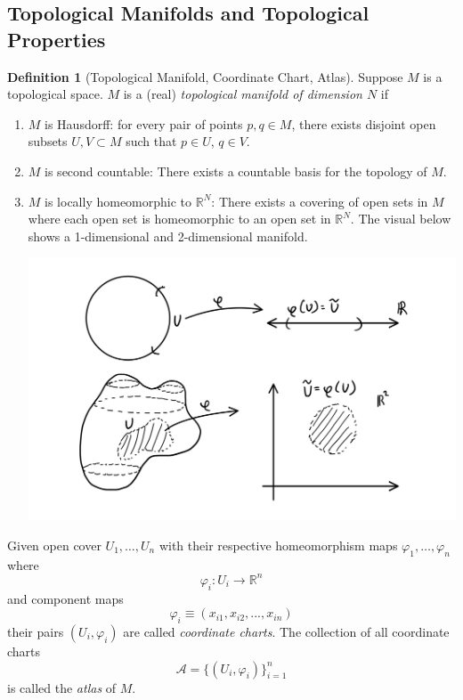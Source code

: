 \documentclass{article}
\theoremstyle{remark}
\theoremstyle{definition}
\newtheorem{definition}{Definition}[section]
\begin{document}
\subsection{Topological Manifolds and Topological Properties}
\begin{definition}[Topological Manifold, Coordinate Chart, Atlas]
Suppose $M$ is a topological space. $M$ is a (real) \textit{topological manifold of dimension $N$} if
\begin{enumerate}
    \item $M$ is Hausdorff: for every pair of points $p, q \in M$, there exists disjoint open subsets $U, V \subset M$ such that $p \in U$, $q \in V$. 
    \item $M$ is second countable: There exists a countable basis for the topology of $M$. 
    \item $M$ is locally homeomorphic to $\mathbb{R}^N$: There exists a covering of open sets in $M$ where each open set is homeomorphic to an open set in $\mathbb{R}^N$. The visual below shows a 1-dimensional and 2-dimensional manifold. 
    \begin{center}
    \includegraphics[scale=0.20]{img/1_2_dim_Manifold_Coordinate_Chart.PNG}
    \end{center}
\end{enumerate}
Given open cover $U_1, \ldots, U_n$ with their respective homeomorphism maps $\varphi_1, \ldots, \varphi_n$ where
  \[\varphi_i : U_i \longrightarrow \mathbb{R}^n\]
and component maps
\[\varphi_i \equiv (x_{i1}, x_{i2}, ..., x_{in})\]
their pairs $(U_i, \varphi_i)$ are called \textit{coordinate charts}. The collection of all coordinate charts 
\[\mathcal{A} = \{(U_i, \varphi_i)\}_{i=1}^n\]
is called the \textit{atlas} of $M$. 
\end{definition}
\end{document}
